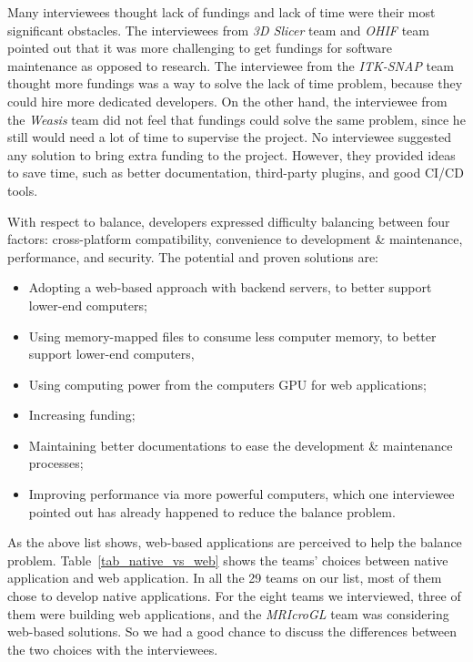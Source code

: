 \documentclass[final, 3p, times, authoryear]{elsarticle}
\begin{document}
Many interviewees thought lack of fundings and lack of time were their most
significant obstacles. The interviewees from \textit{3D Slicer} team and
\textit{OHIF} team pointed out that it was more challenging to get fundings for
software maintenance as opposed to research. The interviewee from the
\textit{ITK-SNAP} team thought more fundings was a way to solve the lack of time
problem, because they could hire more dedicated developers. On the other hand,
the interviewee from the \textit{Weasis} team did not feel that fundings could
solve the same problem, since he still would need a lot of time to supervise the
project.  No interviewee suggested any solution to bring extra funding to the
project. However, they provided ideas to save time, such as better
documentation, third-party plugins, and good CI/CD tools.

With respect to balance, developers expressed difficulty balancing between four
factors: cross-platform compatibility, convenience to development \&
maintenance, performance, and security.  The potential and proven solutions are:

\begin{itemize}
\item Adopting a web-based approach with backend servers, to better support
lower-end computers;
\item Using memory-mapped files to consume less computer memory, to better
support lower-end computers, 
\item Using computing power from the computers GPU for web applications;
\item Increasing funding;
\item Maintaining better documentations to ease the development \& maintenance
processes;
\item Improving performance via more powerful computers, which one interviewee
pointed out has already happened to reduce the balance problem.
\end{itemize}

As the above list shows, web-based applications are perceived to help the
balance problem.  Table~\ref{tab_native_vs_web} shows the teams' choices between
native application and web application. In all the 29 teams on our list, most of
them chose to develop native applications. For the eight teams we interviewed,
three of them were building web applications, and the \textit{MRIcroGL} team was
considering web-based solutions. So we had a good chance to discuss the
differences between the two choices with the interviewees.
\end{document}
